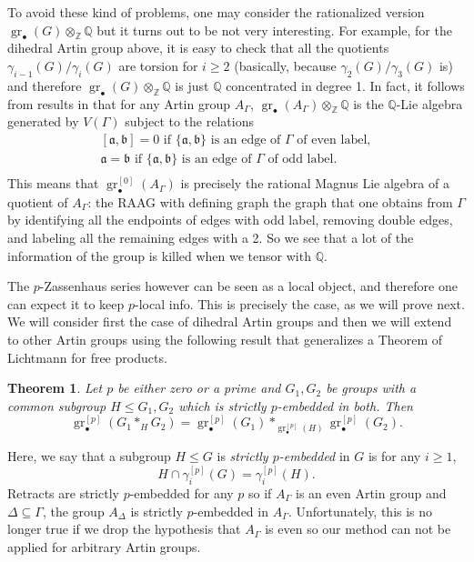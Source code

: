 \documentclass[10pt, oneside]{amsart}
\newcommand{\Z}{\mathbb{Z}} %
\newcommand{\Q}{\mathbb{Q}}
\newcommand{\gr}{\operatorname{gr}} %
\newtheorem{theorem}{Theorem}[section]
\theoremstyle{definition}
\theoremstyle{remark}
\theoremstyle{plain}
\begin{document}
To avoid these kind of problems, one may consider the rationalized version
$\gr_\bullet(G)\otimes_\Z\Q$ but it turns out to be not very interesting. For example, for the dihedral Artin group above, it is easy to check that all the quotients $\gamma_{i-1}(G)/\gamma_{i}(G)$ are torsion for $i\geq 2$ (basically, because $\gamma_2(G)/\gamma_3(G)$ is) and therefore 
$\gr_\bullet(G)\otimes_\Z\Q$ is just $\Q$ concentrated in degree 1. In fact, it follows from results in \cite{KM} that for any Artin group $A_\Gamma$, $\gr_\bullet(A_\Gamma)\otimes_\Z\Q$ is the $\Q$-Lie algebra generated by $V(\Gamma)$ subject to the relations
$$\begin{aligned}
 [\mathfrak{a},\mathfrak{b}]=0\text{ if }\{\mathfrak{a},\mathfrak{b}\}
\text{ is an edge of $\Gamma$ of even label},\\
 \mathfrak{a}=\mathfrak{b}\text{ if }\{\mathfrak{a},\mathfrak{b}\}
\text{ is an edge of $\Gamma$ of odd label}.\\
\end{aligned}$$ 
This means that $\gr^{[0]}_\bullet(A_\Gamma)$ is precisely the rational Magnus Lie algebra of a quotient of $A_\Gamma$: the RAAG with defining graph the graph that one obtains from $\Gamma$ by identifying all the endpoints of edges with odd label, removing double edges, and labeling all the remaining edges with a 2. So we see that a lot of the information of the group is killed when we tensor with $\Q$.


The $p$-Zassenhaus series however can be seen as a local object, and therefore one can expect it to keep $p$-local info. This is precisely the case, as we will prove next. We will consider first the case of dihedral Artin groups and then we will extend to other Artin groups using the following result that generalizes a Theorem of Lichtmann for free products.


\begin{theorem}\cite{LMPW}\label{teo:Giorgio}  Let $p$ be either zero or a prime and $G_1,G_2$ be groups with a common subgroup $H\leq G_1,G_2$ which is strictly $p$-embedded in both.
Then 
$$\gr_\bullet^{[p]}(G_1\ast_HG_2)=\gr_\bullet^{[p]}(G_1)\ast_{\gr_\bullet^{[p]}(H)}\gr_\bullet^{[p]}(G_2).$$
\end{theorem}

Here, we say that a subgroup $H\leq G$ is {\sl strictly $p$-embedded} in $G$ is for any $i\geq 1$,
$$H\cap\gamma_i^{[p]}(G)=\gamma_i^{[p]}(H).$$
Retracts are strictly $p$-embedded for any $p$ so if $A_\Gamma$ is an even Artin group and $\Delta\subseteq\Gamma$, the group $A_\Delta$ is strictly $p$-embedded in $A_\Gamma$.
Unfortunately, this is no longer true if we drop the hypothesis that $A_\Gamma$ is even so our method can not be applied for arbitrary Artin groups. 
\end{document}
